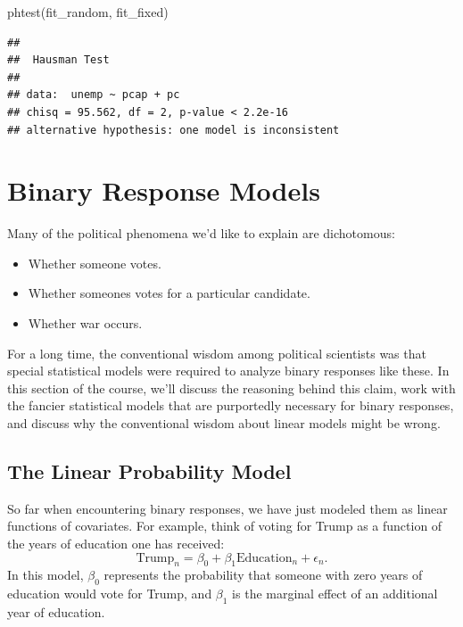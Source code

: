 \documentclass[
  12pt,
  oneside,openany]{book}
\newenvironment{Shaded}{\begin{snugshade}}{\end{snugshade}}
\newcommand{\FunctionTok}[1]{\textcolor[rgb]{0.00,0.00,0.00}{#1}}
\newcommand{\NormalTok}[1]{#1}
\begin{document}
\begin{Shaded}
\begin{Highlighting}[]
\FunctionTok{phtest}\NormalTok{(fit\_random, fit\_fixed)}
\end{Highlighting}
\end{Shaded}

\begin{verbatim}
## 
##  Hausman Test
## 
## data:  unemp ~ pcap + pc
## chisq = 95.562, df = 2, p-value < 2.2e-16
## alternative hypothesis: one model is inconsistent
\end{verbatim}

\hypertarget{logit}{%
\chapter{Binary Response Models}\label{logit}}

Many of the political phenomena we'd like to explain are dichotomous:

\begin{itemize}
\item
  Whether someone votes.
\item
  Whether someones votes for a particular candidate.
\item
  Whether war occurs.
\end{itemize}

For a long time, the conventional wisdom among political scientists was that special statistical models were required to analyze binary responses like these.
In this section of the course, we'll discuss the reasoning behind this claim, work with the fancier statistical models that are purportedly necessary for binary responses, and discuss why the conventional wisdom about linear models might be wrong.

\hypertarget{the-linear-probability-model}{%
\section{The Linear Probability Model}\label{the-linear-probability-model}}

So far when encountering binary responses, we have just modeled them as linear functions of covariates.
For example, think of voting for Trump as a function of the years of education one has received:
\[
\text{Trump}_n = \beta_0 + \beta_1 \text{Education}_n + \epsilon_n.
\]
In this model, \(\beta_0\) represents the probability that someone with zero years of education would vote for Trump, and \(\beta_1\) is the marginal effect of an additional year of education.
\end{document}
